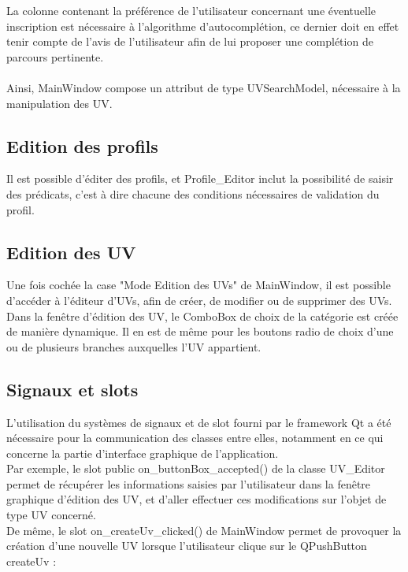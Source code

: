 \documentclass[a4paper,10pt,french]{report}
\begin{document}
	La colonne contenant la préférence de l'utilisateur concernant une éventuelle inscription est nécessaire à l'algorithme d'autocomplétion, ce dernier doit en effet tenir compte de l'avis de l'utilisateur afin de lui proposer une complétion de parcours pertinente.\\\\
    
    Ainsi, MainWindow compose un attribut de type UVSearchModel, nécessaire à la manipulation des UV. %
    
    
	
	
		
	
    \subsection{Edition des profils}\label{subsec:Edition des profils}
        Il est possible d'éditer des profils, et Profile\_Editor inclut la possibilité de saisir des prédicats, c'est à dire chacune des conditions nécessaires de validation du profil.
        
        
	\subsection{Edition des UV}\label{subsec:Edition des UV}
    
		Une fois cochée la case "Mode Edition des UVs" de MainWindow, il est possible d'accéder à l'éditeur d'UVs, afin de créer, de modifier ou de supprimer des UVs.\\
		Dans la fenêtre d'édition des UV, le ComboBox de choix de la catégorie est créée de manière dynamique.
		Il en est de même pour les boutons radio de choix d'une ou de plusieurs branches auxquelles l'UV appartient.
        

    \subsection{Signaux et slots}\label{subsec:signaux et slots}
		L'utilisation du systèmes de signaux et de slot fourni par le framework Qt a été nécessaire pour la communication des classes entre elles, notamment en ce qui concerne la partie d'interface graphique de l'application.\\
        Par exemple, le slot public on\_buttonBox\_accepted() de la classe UV\_Editor permet de récupérer les informations saisies par l'utilisateur dans la fenêtre graphique d'édition des UV, et d'aller effectuer ces modifications sur l'objet de type UV concerné.\\
        De même, le slot on\_createUv\_clicked() de MainWindow permet de provoquer la création d'une nouvelle UV lorsque l'utilisateur clique sur le QPushButton createUv : 
        
\end{document}
